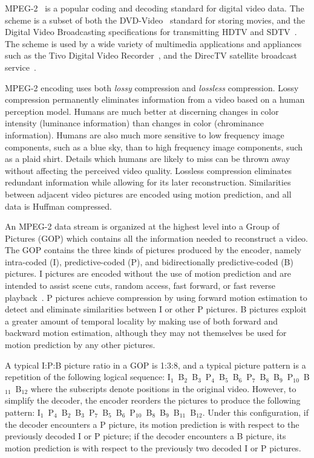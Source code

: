 
MPEG-2~\cite{MPEG2} is a popular coding and decoding standard
for digital video data. The scheme is a subset of both the
DVD-Video~\cite{Taylor:1999:SDV} standard for storing movies, and the Digital
Video Broadcasting specifications for transmitting HDTV and
SDTV~\cite{DVB}. The scheme is used by a wide variety of multimedia
applications and appliances such as the Tivo Digital Video
Recorder~\cite{tivo}, and the DirecTV satellite broadcast
service~\cite{directv}.

MPEG-2 encoding uses both {\it lossy} compression and {\it lossless}
compression. Lossy compression permanently eliminates information from
a video based on a human perception model. Humans are much better at
discerning changes in color intensity (luminance information) than
changes in color (chrominance information). Humans are also much more
sensitive to low frequency image components, such as a blue sky, than
to high frequency image components, such as a plaid shirt. Details
which humans are likely to miss can be thrown away without affecting
the perceived video quality. Lossless compression eliminates 
redundant information while allowing for its later reconstruction. 
Similarities between adjacent video pictures are encoded using motion 
prediction, and all data is Huffman compressed\cite{Huffman52}. 

An MPEG-2 data stream is organized at the highest level into a Group of 
Pictures (GOP) which contains all the information needed to reconstruct a
video. The GOP contains the three kinds of pictures produced by the
encoder, namely intra-coded (I), predictive-coded (P), and bidirectionally
predictive-coded (B) pictures. I pictures are encoded without the use of 
motion prediction and are intended to assist scene cuts, random access, 
fast forward, or fast reverse playback~\cite[p. 14]{MPEG2}. P pictures 
achieve compression by using forward motion estimation to detect and eliminate
similarities between I or other P pictures. B pictures exploit a greater
amount of temporal locality by making use of both forward and backward 
motion estimation, although they may not themselves be used for motion 
prediction by any other pictures.

A typical I:P:B picture ratio in a GOP
is 1:3:8, and a typical picture pattern is a repetition of the
following logical sequence:
I$_1$~B$_2$~B$_3$~P$_4$~B$_5$~B$_6$~P$_7$~B$_8$~B$_9$~P$_{10}$~B$_{11}$~B$_{12}$
where the subscripts denote positions in the original video.  However,
to simplify the decoder, the encoder reorders the pictures to produce
the following pattern:
I$_1$~P$_4$~B$_2$~B$_3$~P$_7$~B$_5$~B$_6$~P$_{10}$~B$_8$~B$_9$~B$_{11}$~B$_{12}$.
Under this configuration, if the decoder encounters a P picture, its
motion prediction is with respect to the previously decoded I or P
picture; if the decoder encounters a B picture, its motion prediction
is with respect to the previously two decoded I or P pictures.


